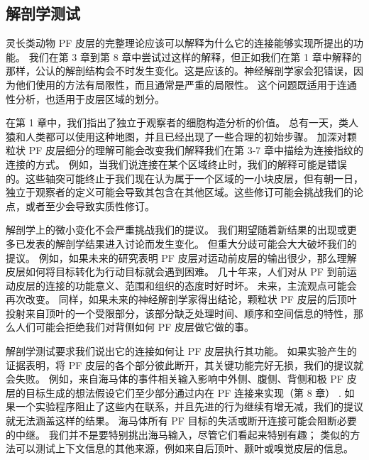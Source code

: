 \subsection{解剖学测试}
灵长类动物 PF 皮层的完整理论应该可以解释为什么它的连接能够实现所提出的功能。 我们在第 3 章到第 8 章中尝试过这样的解释，但正如我们在第 1 章中解释的那样，公认的解剖结构会不时发生变化。这是应该的。神经解剖学家会犯错误，因为他们使用的方法有局限性，而且通常是严重的局限性。 这个问题既适用于连通性分析，也适用于皮层区域的划分。
\par 
在第 1 章中，我们指出了独立于观察者的细胞构造分析的价值。 总有一天，类人猿和人类都可以使用这种地图，并且已经出现了一些合理的初始步骤。 加深对颗粒状 PF 皮层细分的理解可能会改变我们解释我们在第 3-7 章中描绘为连接指纹的连接的方式。 例如，当我们说连接在某个区域终止时，我们的解释可能是错误的。这些轴突可能终止于我们现在认为属于一个区域的一小块皮层，但有朝一日，独立于观察者的定义可能会导致其包含在其他区域。这些修订可能会挑战我们的论点，或者至少会导致实质性修订。
\par 
解剖学上的微小变化不会严重挑战我们的提议。 我们期望随着新结果的出现或更多已发表的解剖学结果进入讨论而发生变化。 但重大分歧可能会大大破坏我们的提议。 例如，如果未来的研究表明 PF 皮层对运动前皮层的输出很少，那么理解皮层如何将目标转化为行动目标就会遇到困难。 几十年来，人们对从 PF 到前运动皮层的连接的功能意义、范围和组织的态度时好时坏。 未来，主流观点可能会再次改变。 同样，如果未来的神经解剖学家得出结论，颗粒状 PF 皮层的后顶叶投射来自顶叶的一个受限部分，该部分缺乏处理时间、顺序和空间信息的特性，那么人们可能会拒绝我们对背侧如何 PF 皮层做它做的事。
\par 
解剖学测试要求我们说出它的连接如何让 PF 皮层执行其功能。 如果实验产生的证据表明，将 PF 皮层的各个部分彼此断开，其关键功能完好无损，我们的提议就会失败。 例如，来自海马体的事件相关输入影响中外侧、腹侧、背侧和极 PF 皮层的目标生成的想法假设它们至少部分通过内在 PF 连接来实现（第 8 章） . 如果一个实验程序阻止了这些内在联系，并且先进的行为继续有增无减，我们的提议就无法涵盖这样的结果。 海马体所有 PF 目标的失活或断开连接可能会阻断必要的中继。 我们并不是要特别挑出海马输入，尽管它们看起来特别有趣； 类似的方法可以测试上下文信息的其他来源，例如来自后顶叶、颞叶或嗅觉皮层的信息。
